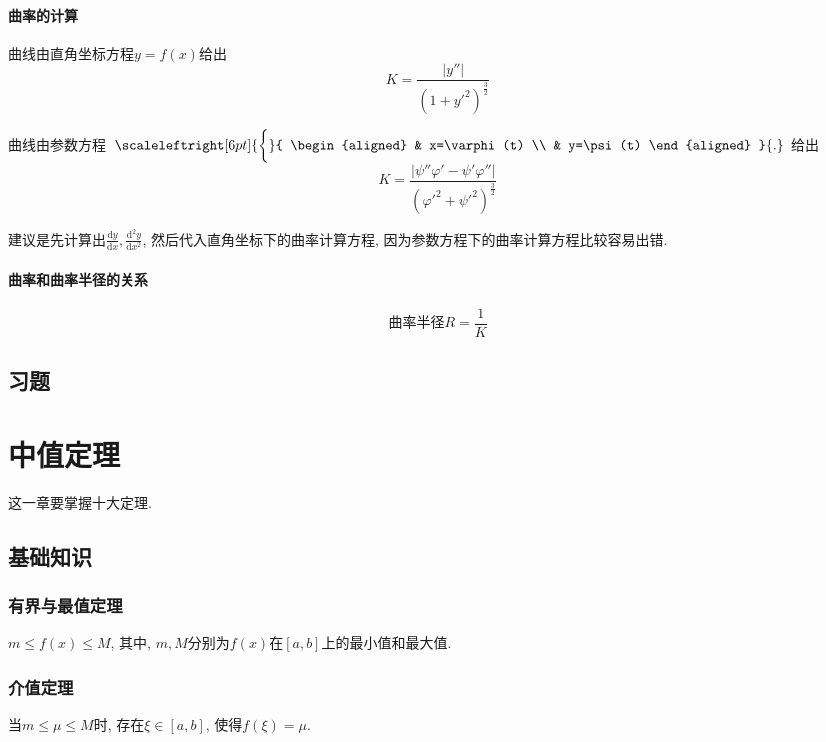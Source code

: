 \subsubsection{曲率的计算}
{\kaishu 曲线由直角坐标方程$ y=f(x) $给出}
\begin{equation*}
    K=\frac{|y''|}{(1+y'^{2})^{\frac{3}{2}}}
\end{equation*}\par \vspace{.5em}
{\kaishu 曲线由参数方程\ }$
    \scaleleftright[6pt]{\biggl\{}{
        \begin{aligned}
             & x=\varphi(t) \\
             & y=\psi(t)
        \end{aligned} }{.} $ {\kaishu 给出}
\begin{equation*}
    K=\frac{|\psi''\varphi'-\psi'\varphi''|}{(\varphi'^{2}+\psi'^{2})^{\frac{3}{2}}}
\end{equation*}\par
建议是先计算出$ \frac{\mathrm{d}y}{\mathrm{d}x}, \frac{\mathrm{d}^{2}y}{\mathrm{d}x^{2}} $, 然后代入直角坐标下的曲率计算方程, 因为参数方程下的曲率计算方程比较容易出错.
\subsubsection{曲率和曲率半径的关系}
\begin{equation*}
    \text{曲率半径}R=\frac{1}{K}
\end{equation*}
\section{习题}
\chapter{中值定理}
这一章要掌握十大定理.
\section{基础知识}
\subsection{有界与最值定理}
$ m\le f(x)\le M $, 其中, $ m,M $分别为$ f(x) $在$ [a,b] $上的最小值和最大值.
\subsection{介值定理}
当$ m\le \mu\le M $时, 存在$ \xi\in [a,b] $, 使得$ f(\xi)=\mu $.
